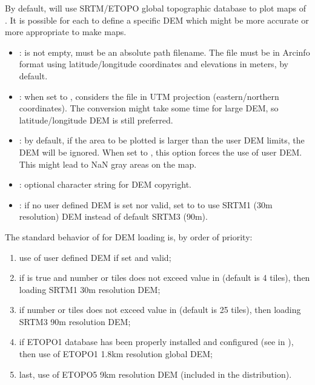 By default, \webobs will use SRTM/ETOPO global topographic database to plot maps of . It is possible for each  to define a specific DEM which might be more accurate or more appropriate to make maps.
\begin{itemize}

\item {}: is not empty, must be an absolute path filename. The file must be in Arcinfo format using latitude/longitude coordinates and elevations in meters, by default.

\item {}: when set to , considers the file in UTM projection (eastern/northern coordinates). The conversion might take some time for large DEM, so latitude/longitude DEM is still preferred.

\item {}: by default, if the area to be plotted is larger than the user DEM limits, the DEM will be ignored. When set to , this option forces the use of user DEM. This might lead to NaN gray areas on the map.

\item {}: optional character string for DEM copyright.

\item {}: if no user defined DEM is set nor valid, set to  to use SRTM1 (30m resolution) DEM instead of default SRTM3 (90m).

\end{itemize}

The standard behavior of \webobs for DEM loading is, by order of priority:
\begin{enumerate}

\item use of user defined DEM if set and valid;

\item if  is true and number or tiles does not exceed  value in  (default is 4 tiles), then loading SRTM1 30m resolution DEM;

\item if number or tiles does not exceed  value in  (default is 25 tiles), then loading SRTM3 90m resolution DEM;

\item if ETOPO1 database has been properly installed and configured (see  in ), then use of ETOPO1 1.8km resolution global DEM;

\item last, use of ETOPO5 9km resolution DEM (included in the \webobs distribution).

\end{enumerate}


